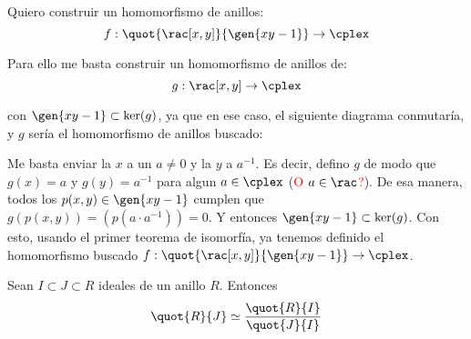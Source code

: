 \begin{example}
Quiero construir un homomorfismo de anillos:
$$f: \quot{\rac[x,y]}{\gen{xy-1}} \rightarrow \cplex$$

Para ello me basta construir un homomorfismo de anillos de:
$$g: \rac[x,y] \rightarrow \cplex$$

con $\gen{xy-1} \subset \ker (g)$, ya que en ese caso, el siguiente diagrama conmutaría, y $g$ sería el homomorfismo de anillos buscado:


Me basta enviar la $x$ a un $a\neq 0$ y la $y$ a $a^{-1}$. Es decir, defino $g$ de modo que $g(x)=a$ y $g(y)=a^{-1}$ para algun $a \in \cplex$ (\textcolor{red}{O $a \in \rac$?}). De esa manera, todos los $p(x,y) \in \gen{xy-1}$ cumplen que $g(p(x,y))=(p(a\cdot a^{-1}))=0$. Y entonces $ \gen{xy-1} \subset \ker (g)$. Con esto, usando el primer teorema de isomorfía, ya tenemos definido el homomorfismo buscado $f: \quot{\rac[x,y]}{\gen{xy-1}} \rightarrow \cplex$.
\end{example}




\begin{theorem} \label{thm:IsomorfiaAnillos2} Sean $I ⊂ J ⊂ R$ ideales de un anillo $R$. Entonces \[ \quot{R}{J} \simeq \frac{\quot{R}{I}}{\quot{J}{I}} \]
\end{theorem}

